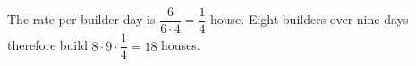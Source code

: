 The rate per builder-day is $\dfrac{6}{6\cdot4}=\dfrac{1}{4}$ house. Eight builders over nine days therefore build $8\cdot9\cdot\dfrac{1}{4}=\boxed{18}$ houses.
